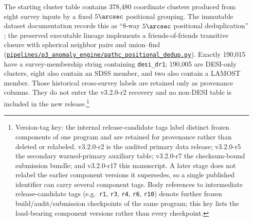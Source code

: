 \documentclass[twocolumn,linenumbers]{aastex702}
\newcommand{\repoBase}{https://github.com/Hubify-Projects/bigbounce/blob/main}
\newcommand{\artifact}[1]{\href{\repoBase/#1}{\nolinkurl{#1}}}
\newcommand{\paperVersion}{v3.2.0-r17}
\newcommand{\releaseVersion}{v3.2.0-r2}
\newcommand{\warnedAuxVersion}{v3.2.0-r5}
\newcommand{\bundleVersion}{v3.2.0-r7}
\begin{document}
The starting cluster table contains 378,480 coordinate clusters produced from eight survey
inputs by a fixed $5\arcsec$ positional grouping.  The immutable dataset documentation records
this as ``8-way $5\arcsec$ positional deduplication'' \citep{Golden2026Data}; the preserved
executable lineage implements a friends-of-friends transitive closure with spherical neighbor
pairs and union--find
(\artifact{pipelines/p3\_anomaly\_engine/pathc\_positional\_dedup.py}).  Exactly 190,015 have a
survey-membership string containing \texttt{desi\_dr1};
190,005 are DESI-only clusters, eight also contain an SDSS member, and two also contain a LAMOST
member.  Those historical cross-survey labels are retained only as provenance columns.  They do
not enter the \releaseVersion{} recovery and no non-DESI table is included in the new
release.\footnote{Version-tag key: the internal release-candidate tags label distinct frozen
components of one program and are retained for provenance rather than deleted or relabeled.
\releaseVersion{} is the audited primary data release; \warnedAuxVersion{} the secondary
warned-primary auxiliary table; \bundleVersion{} the checksum-bound submission bundle; and
\paperVersion{} this manuscript.  A later stage does not relabel the earlier component versions it
supersedes, so a single published identifier can carry several component tags.  Body references to
intermediate release-candidate tags (e.g.\ \texttt{r1}, \texttt{r3}, \texttt{r4}, \texttt{r6},
\texttt{r10}) denote further frozen build/audit/submission checkpoints of the same program; this
key lists the load-bearing component versions rather than every checkpoint.}
\end{document}
